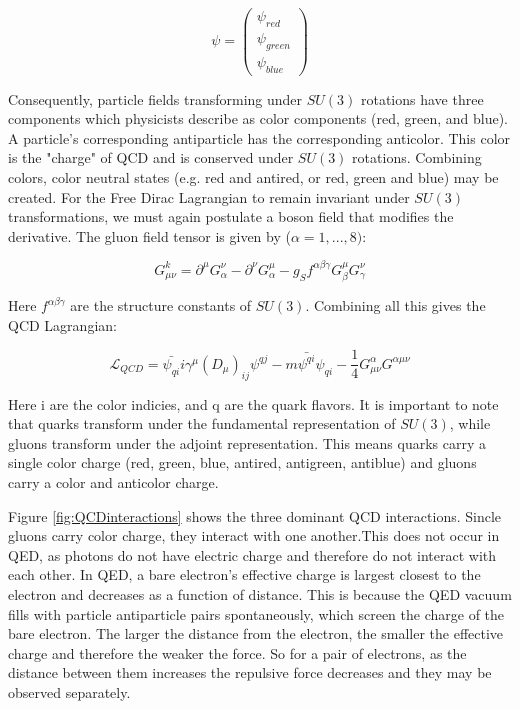 \begin{equation}
\psi = \begin{pmatrix} \psi_{red} \\ \psi_{green} \\ \psi_{blue}\end{pmatrix}
\end{equation}

Consequently, particle fields transforming under $SU(3)$ rotations have three components which physicists describe as color components (red, green, and blue). A particle's corresponding antiparticle has the corresponding anticolor. This color is the "charge" of QCD and is conserved under $SU(3)$ rotations. Combining colors, color neutral states (e.g. red and antired, or red, green and blue) may be created.
For the Free Dirac Lagrangian to remain invariant under $SU(3)$ transformations, we must again postulate a boson field that modifies the derivative. The gluon field tensor is given by ($\alpha=1,...,8)$:

\begin{equation}
G_{\mu\nu}^{k}  = \partial^{\mu}G^{\nu}_{\alpha}-\partial^{\nu}G^{\mu}_{\alpha}-g_{S}f^{\alpha\beta\gamma}G^{\mu}_{\beta}G^{\nu}_{\gamma}
\end{equation}

Here $f^{\alpha\beta\gamma}$ are the structure constants of $SU(3)$. Combining all this gives the QCD Lagrangian:

\begin{equation}
\mathcal{L}_{QCD} = \bar{\psi_{qi}}i\gamma^{\mu} (D_{\mu})_{ij}\psi^{qj} - m\bar{\psi^{qi}}\psi_{qi} - \frac{1}{4}G^{\alpha}_{\mu\nu}G^{\alpha\mu\nu} 
\end{equation}

Here i are the color indicies, and q are the quark flavors. It is important to note that quarks transform under the fundamental representation of $SU(3)$, while gluons transform under the adjoint representation. This means quarks carry a single color charge (red, green, blue, antired, antigreen, antiblue) and gluons carry a color and anticolor charge. 

Figure \ref{fig:QCDinteractions} shows the three dominant QCD interactions. Sincle gluons carry color charge, they interact with one another.This does not occur in QED, as photons do not have electric charge and therefore do not interact with each other. In QED, a bare electron's effective charge is largest closest to the electron and decreases as a function of distance. This is because the QED vacuum fills with particle antiparticle pairs spontaneously, which screen the charge of the bare electron. The larger the distance from the electron, the smaller the effective charge and therefore the weaker the force. So for a pair of electrons, as the distance between them increases the repulsive force decreases and they may be observed separately.


